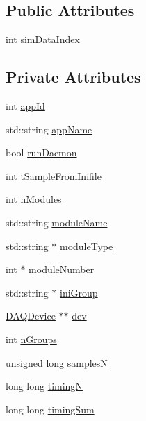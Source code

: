 \subsection*{Public Attributes}
\begin{DoxyCompactItemize}
\item 
int \hyperlink{classDataServer_a85f6bfc815d5da78904704e04f58de4a}{sim\-Data\-Index}
\end{DoxyCompactItemize}
\subsection*{Private Attributes}
\begin{DoxyCompactItemize}
\item 
int \hyperlink{classDataServer_a2336dffa57e35c69c5ae0927d5e9e052}{app\-Id}
\item 
std\-::string \hyperlink{classDataServer_a8a26d65b11f0160c99cc00ab4a700a37}{app\-Name}
\item 
bool \hyperlink{classDataServer_a6dec7e960603680e4114abc5b91a8457}{run\-Daemon}
\item 
int \hyperlink{classDataServer_a0b926a7dc0e5ddcf958abedd937c362b}{t\-Sample\-From\-Inifile}
\item 
int \hyperlink{classDataServer_a099becd424d2c231270d8bf7682f86f7}{n\-Modules}
\item 
std\-::string \hyperlink{classDataServer_a38e8fd47db320927a4e7fe20226dc23d}{module\-Name}
\item 
std\-::string $\ast$ \hyperlink{classDataServer_ac2f86dedb120b60f6da583a3931f48a7}{module\-Type}
\item 
int $\ast$ \hyperlink{classDataServer_a4f01751e8d4a8d1ca9fd0e8cbb1240bb}{module\-Number}
\item 
std\-::string $\ast$ \hyperlink{classDataServer_a746d543bae3ea60b7c617413951c8e3c}{ini\-Group}
\item 
\hyperlink{classDAQDevice}{D\-A\-Q\-Device} $\ast$$\ast$ \hyperlink{classDataServer_a633e024ceb49f38f68a3f2cff5303cb4}{dev}
\item 
int \hyperlink{classDataServer_a6ef6ff1d012d3d199bd2d4ea2889e1fc}{n\-Groups}
\item 
unsigned long \hyperlink{classDataServer_a607273a35cc1cd03b19d548503ad7831}{samples\-N}
\item 
long long \hyperlink{classDataServer_abc58efaf6db25b7e8160a3adf62590af}{timing\-N}
\item 
long long \hyperlink{classDataServer_af821fc16f79698b3986813f7fce05cc1}{timing\-Sum}
$$
\end{DoxyCompactItemize}
